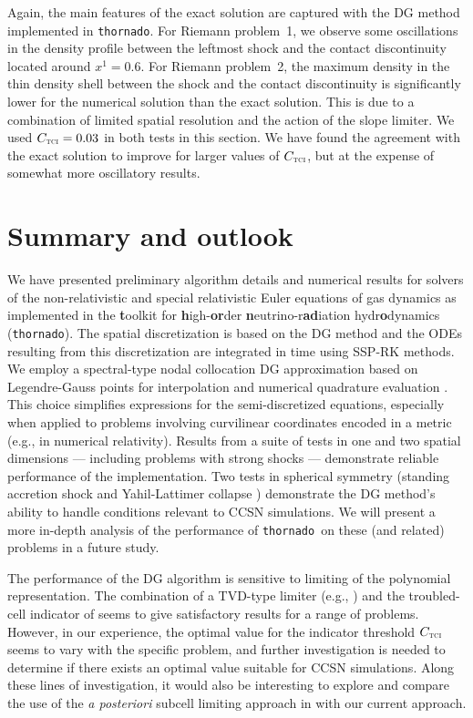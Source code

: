 \documentclass[letterpaper]{jpconf}
\newcommand{\TCI}{\textnormal{\tiny\textsc{TCI}}}
\newcommand{\thornado}{\texttt{thornado}}
\begin{document}
Again, the main features of the exact solution are captured with the DG method implemented in \thornado.  
For Riemann problem~1, we observe some oscillations in the density profile between the leftmost shock and the contact discontinuity located around $x^{1}=0.6$.  
For Riemann problem~2, the maximum density in the thin density shell between the shock and the contact discontinuity is significantly lower for the numerical solution than the exact solution.  
This is due to a combination of limited spatial resolution and the action of the slope limiter.  
We used $C_{\TCI}=0.03$ in both tests in this section.  
We have found the agreement with the exact solution to improve for larger values of $C_{\TCI}$, but at the expense of somewhat more oscillatory results.  

\section{Summary and outlook}

We have presented preliminary algorithm details and numerical results for solvers of the non-relativistic and special relativistic Euler equations of gas dynamics as implemented in the {\bf t}oolkit for {\bf h}igh-{\bf or}der {\bf n}eutrino-r{\bf ad}iation hydr{\bf o}dynamics (\thornado).  
The spatial discretization is based on the DG method and the ODEs resulting from this discretization are integrated in time using SSP-RK methods.  
We employ a spectral-type nodal collocation DG approximation based on Legendre-Gauss points for interpolation and numerical quadrature evaluation \cite{bassi_etal_2013}.  
This choice simplifies expressions for the semi-discretized equations, especially when applied to problems involving curvilinear coordinates encoded in a metric (e.g., in numerical relativity).  
Results from a suite of tests in one and two spatial dimensions --- including problems with strong shocks --- demonstrate reliable performance of the implementation.  
Two tests in spherical symmetry (standing accretion shock \cite{blondin_etal_2003} and Yahil-Lattimer collapse \cite{yahilLattimer_1982,yahil_1983}) demonstrate the DG method's ability to handle conditions relevant to CCSN simulations.  
We will present a more in-depth analysis of the performance of \thornado\ on these (and related) problems in a future study.  

The performance of the DG algorithm is sensitive to limiting of the polynomial representation.  
The combination of a TVD-type limiter (e.g., \cite{cockburnShu_1998}) and the troubled-cell indicator of \cite{fuShu_2017} seems to give satisfactory results for a range of problems.  
However, in our experience, the optimal value for the indicator threshold $C_{\TCI}$ seems to vary with the specific problem, and further investigation is needed to determine if there exists an optimal value suitable for CCSN simulations.  
Along these lines of investigation, it would also be interesting to explore and compare the use of the {\it a posteriori} subcell limiting approach in \cite{dumbser_etal_2014,fambri_etal_2018} with our current approach.  
\end{document}
